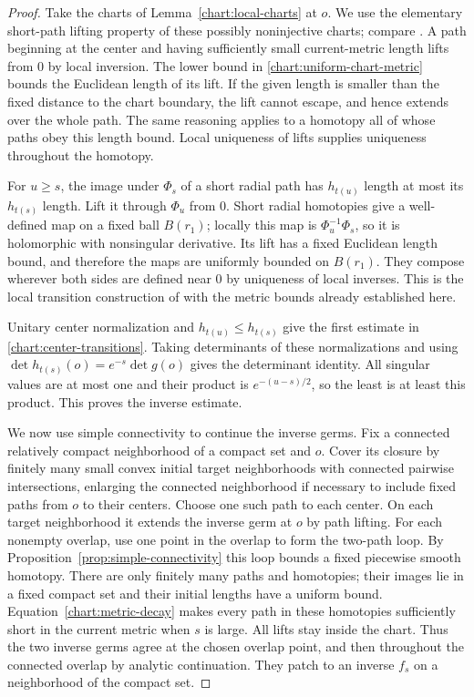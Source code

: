 \documentclass[11pt]{article}
\theoremstyle{definition}
\theoremstyle{remark}
\numberwithin{equation}{section}
\begin{document}
\begin{proof}
Take the charts of Lemma~\ref{chart:local-charts} at $o$.
We use the elementary short-path lifting property of these
possibly noninjective charts; compare
\cite[Lemmas~2.2--2.3 and Corollary~2.2]{ChauTamStein}.
A path beginning at the center and having sufficiently small
current-metric length lifts from $0$ by local inversion.
The lower bound in \eqref{chart:uniform-chart-metric} bounds
the Euclidean length of its lift.  If the given length is
smaller than the fixed distance to the chart boundary, the
lift cannot escape, and hence extends over the whole path.
The same reasoning applies to a homotopy all of whose paths
obey this length bound.  Local uniqueness of lifts supplies
uniqueness throughout the homotopy.

For $u\ge s$, the image under $\Phi_s$ of a short radial path
has $h_{t(u)}$ length at most its $h_{t(s)}$ length.  Lift it
through $\Phi_u$ from $0$.  Short radial homotopies give a
well-defined map on a fixed ball $B(r_1)$; locally this map
is $\Phi_u^{-1}\Phi_s$, so it is holomorphic with nonsingular
derivative.  Its lift has a fixed Euclidean length bound, and
therefore the maps are uniformly bounded on $B(r_1)$.
They compose wherever both sides are defined near $0$ by
uniqueness of local inverses.  This is the local transition
construction of \cite[Lemmas~3.1--3.2]{ChauTamStein} with the
metric bounds already established here.

Unitary center normalization and $h_{t(u)}\le h_{t(s)}$
give the first estimate in \eqref{chart:center-transitions}.
Taking determinants of these normalizations and using
$\det h_{t(s)}(o)=e^{-s}\det g(o)$ gives the determinant
identity.  All singular values are at most one and their
product is $e^{-(u-s)/2}$, so the least is at least this
product.  This proves the inverse estimate.

We now use simple connectivity to continue the inverse germs.
Fix a connected relatively compact neighborhood of a compact
set and $o$.  Cover its closure by finitely many small convex
initial target neighborhoods with connected pairwise
intersections, enlarging the connected neighborhood if
necessary to include fixed paths from $o$ to their centers.
Choose one such path to each center.  On each target
neighborhood it extends the inverse germ at $o$ by path
lifting.  For each nonempty overlap, use one point in the
overlap to form the two-path loop.  By
Proposition~\ref{prop:simple-connectivity} this loop bounds
a fixed piecewise smooth homotopy.  There are only finitely
many paths and homotopies; their images lie in a fixed
compact set and their initial lengths have a uniform bound.
Equation~\eqref{chart:metric-decay} makes every path in these
homotopies sufficiently short in the current metric when
$s$ is large.  All lifts stay inside the chart.  Thus the
two inverse germs agree at the chosen overlap point, and
then throughout the connected overlap by analytic
continuation.  They patch to an inverse $f_s$ on a
neighborhood of the compact set.


\end{proof}
\end{document}

